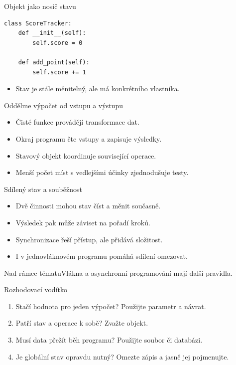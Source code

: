 \documentclass[aspectratio=169]{beamer}
\begin{document}
\begin{frame}[fragile]{Objekt jako nosič stavu}
\begin{lstlisting}[style=python]
class ScoreTracker:
    def __init__(self):
        self.score = 0

    def add_point(self):
        self.score += 1
\end{lstlisting}
\begin{itemize}\item Stav je stále měnitelný, ale má konkrétního vlastníka.\end{itemize}
\end{frame}

\begin{frame}{Oddělme výpočet od vstupu a výstupu}
\begin{itemize}
\item Čisté funkce provádějí transformace dat.
\item Okraj programu čte vstupy a zapisuje výsledky.
\item Stavový objekt koordinuje související operace.
\item Menší počet míst s vedlejšími účinky zjednodušuje testy.
\end{itemize}
\end{frame}

\begin{frame}{Sdílený stav a souběžnost}
\begin{itemize}
\item Dvě činnosti mohou stav číst a měnit současně.
\item Výsledek pak může záviset na pořadí kroků.
\item Synchronizace řeší přístup, ale přidává složitost.
\item I v jednovláknovém programu pomáhá sdílení omezovat.
\end{itemize}
\begin{block}{Nad rámec tématu}Vlákna a asynchronní programování mají další pravidla.\end{block}
\end{frame}

\begin{frame}{Rozhodovací vodítko}
\begin{enumerate}
\item Stačí hodnota pro jeden výpočet? Použijte parametr a návrat.
\item Patří stav a operace k sobě? Zvažte objekt.
\item Musí data přežít běh programu? Použijte soubor či databázi.
\item Je globální stav opravdu nutný? Omezte zápis a jasně jej pojmenujte.
\end{enumerate}
\end{frame}
\end{document}
